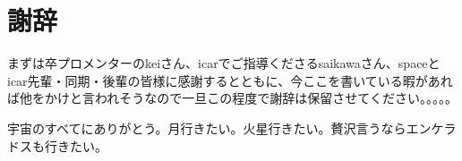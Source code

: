 \chapter*{謝辞}
まずは卒プロメンターのkeiさん、icarでご指導くださるsaikawaさん、spaceとicar先輩・同期・後輩の皆様に感謝するとともに、今ここを書いている暇があれば他をかけと言われそうなので一旦この程度で謝辞は保留させてください。。。。。

宇宙のすべてにありがとう。月行きたい。火星行きたい。贅沢言うならエンケラドスも行きたい。
